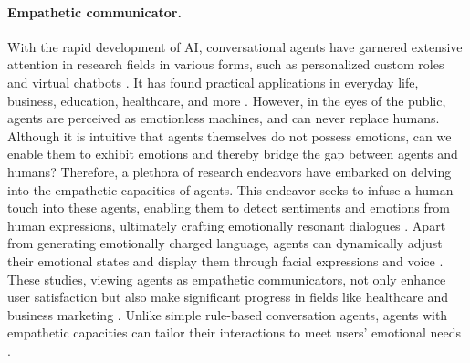 \paragraph{Empathetic communicator.}
With the rapid development of AI, conversational agents have garnered extensive attention in research fields in various forms, such as personalized custom roles and virtual chatbots \cite{DBLP:series/synthesis/2020McTear}. It has found practical applications in everyday life, business, education, healthcare, and more \cite{DBLP:journals/corr/abs-2106-10901, DBLP:journals/ijmms/RappCB21, adamopoulou2020chatbots}. However, in the eyes of the public, agents are perceived as emotionless machines, and can never replace humans. Although it is intuitive that agents themselves do not possess emotions, can we enable them to exhibit emotions and thereby bridge the gap between agents and humans? Therefore, a plethora of research endeavors have embarked on delving into the empathetic capacities of agents. This endeavor seeks to infuse a human touch into these agents, enabling them to detect sentiments and emotions from human expressions, ultimately crafting emotionally resonant dialogues \cite{DBLP:conf/ijcai/Wang018, DBLP:conf/acl/WangZ18, lin2019caire, DBLP:journals/corr/abs-2110-03949, DBLP:conf/emnlp/LinMSXF19, DBLP:conf/emnlp/MajumderHPLGGMP20, DBLP:conf/aaai/SabourZH22, DBLP:conf/aaai/LiLRRC22}. Apart from generating emotionally charged language, agents can dynamically adjust their emotional states and display them through facial expressions and voice \cite{DBLP:journals/corr/abs-2308-03022}. These studies, viewing agents as empathetic communicators, not only enhance user satisfaction but also make significant progress in fields like healthcare \cite{ hsu2023helping,DBLP:conf/iva/AliRLMKRSH20, DBLP:journals/cbsn/LiuS18} and business marketing \cite{liu2022artificial}. Unlike simple rule-based conversation agents, agents with empathetic capacities can tailor their interactions to meet users' emotional needs \cite{DBLP:conf/amia/SuFJ0C20}.

